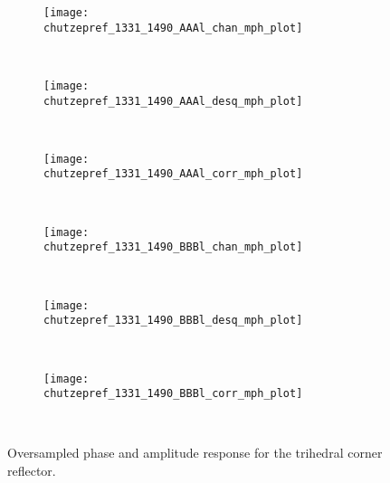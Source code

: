 \begin{figure*}[h]
	\begin{subfigure}[b]{0.6\columnwidth}
		\centering
		\texttt{[image: \\chutzepref\_1331\_1490\_AAAl\_chan\_mph\_plot]}
		\label{fig:tcr_mph:HH_uncorr}
	\end{subfigure}~
	\begin{subfigure}[b]{0.6\columnwidth}
		\centering
		\texttt{[image: \\chutzepref\_1331\_1490\_AAAl\_desq\_mph\_plot]}
		\label{fig:tcr_mph:HH_corr}
	\end{subfigure}~
	\begin{subfigure}[b]{0.6\columnwidth}
		\centering
		\texttt{[image: \\chutzepref\_1331\_1490\_AAAl\_corr\_mph\_plot]}
		\label{fig:tcr_mph:HH_corr_ph}
	\end{subfigure}\\
	\begin{subfigure}[b]{0.6\columnwidth}
		\centering
		\texttt{[image: \\chutzepref\_1331\_1490\_BBBl\_chan\_mph\_plot]}
		\label{fig:tcr_mph:VV_uncorr}
	\end{subfigure}~
	\begin{subfigure}[b]{0.6\columnwidth}
		\centering
		\texttt{[image: \\chutzepref\_1331\_1490\_BBBl\_desq\_mph\_plot]}
		\label{fig:tcr_mph:VV_corr}
	\end{subfigure}~
	\begin{subfigure}[b]{0.6\columnwidth}
		\centering
		\texttt{[image: \\chutzepref\_1331\_1490\_BBBl\_corr\_mph\_plot]}
		\label{fig:tcr_mph:VV_corr_ph}
	\end{subfigure}~

	\caption{Oversampled phase and amplitude response for the trihedral corner reflector.}
	\label{fig:tcr_mph}
\end{figure*}
